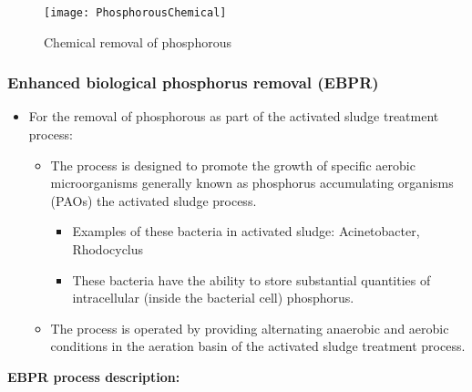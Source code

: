 			\begin{figure}[h]	
				\begin{center}
					\texttt{[image: PhosphorousChemical]}
					\caption{Chemical removal of phosphorous}
				\end{center}
					\end{figure}
\subsubsection{Enhanced biological phosphorus removal (EBPR)}
				\begin{itemize}
					\item For the removal of phosphorous as part of the activated sludge treatment process:\\
					\begin{itemize}
					\item The process is designed to promote the growth of specific aerobic microorganisms generally known as phosphorus accumulating organisms (PAOs) the activated sludge process.  
					\begin{itemize}
					\item Examples of these bacteria in activated sludge: Acinetobacter, Rhodocyclus
					\item These bacteria have the ability to store substantial quantities of intracellular (inside the bacterial cell) phosphorus.
					\end{itemize}
					
					\item The process is operated by providing alternating anaerobic and aerobic conditions in the aeration basin of the activated sludge treatment process.
				\end{itemize}
				\end{itemize}
			\textbf{EBPR process description:}
